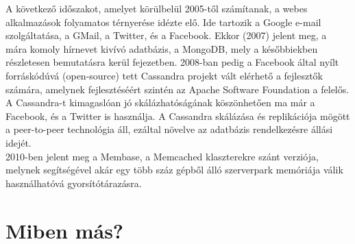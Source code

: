 A következő időszakot, amelyet körülbelül 2005-től számítanak, a webes alkalmazások folyamatos térnyerése idézte elő. Ide tartozik a Google e-mail szolgáltatása, a GMail, a Twitter, és a Facebook. Ekkor (2007) jelent meg, a mára komoly hírnevet kivívó adatbázis, a MongoDB, mely a későbbiekben részletesen bemutatásra kerül  fejezetben. 2008-ban pedig a Facebook által nyílt forráskódúvá (open-source) tett Cassandra projekt vált elérhető a fejlesztők számára, amelynek fejlesztéséért szintén az Apache Software Foundation a felelős. A Cassandra-t kimagaslóan jó skálázhatóságának köszönhetően ma már a Facebook, és a Twitter is használja. A Cassandra skálázása és replikációja mögött a peer-to-peer technológia áll, ezáltal növelve az adatbázis rendelkezésre állási idejét.\\
2010-ben jelent meg a Membase, a Memcached klaszterekre szánt verziója, melynek segítségével akár egy több száz gépből álló szerverpark memóriája válik használhatóvá gyorsítótárazásra. 

\section{Miben más?}


